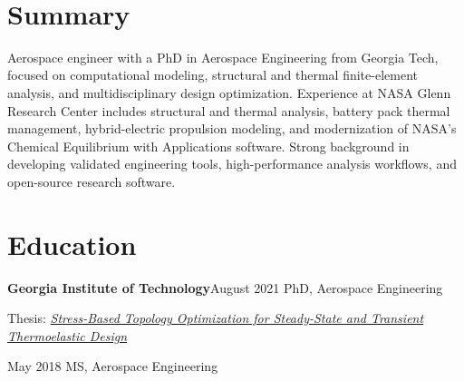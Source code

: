 \begin{header}
    \fontsize{25pt}{25pt}\selectfont \ResumeName

    \vspace{5pt}

    \normalsize
    \ifdefined\ResumeEmail
        \mbox{}\\
    \fi
    \mbox{\ResumeLocation}%
    \ifdefined\ResumePhone
        \ResumeContactSep\mbox{\ResumePhone}%
    \fi
    \ResumeContactSep\mbox{}%
    \ResumeContactSep\mbox{}%
\end{header}

\vspace{4pt}

\section{Summary}
Aerospace engineer with a PhD in Aerospace Engineering from Georgia Tech, focused on computational modeling, structural and thermal finite-element analysis, and multidisciplinary design optimization. Experience at NASA Glenn Research Center includes structural and thermal analysis, battery pack thermal management, hybrid-electric propulsion modeling, and modernization of NASA’s Chemical Equilibrium with Applications software. Strong background in developing validated engineering tools, high-performance analysis workflows, and open-source research software.

\section{Education}
\begin{threecolentry}{\textbf{Georgia Institute of Technology}}{August 2021}
    PhD, Aerospace Engineering
    \begin{highlights}
        \item Thesis: \href{http://hdl.handle.net/1853/65093}{\textit{Stress-Based Topology Optimization for Steady-State and Transient Thermoelastic Design}}
    \end{highlights}
\end{threecolentry}

\begin{threecolentry}{}{May 2018}
    MS, Aerospace Engineering
\end{threecolentry}

